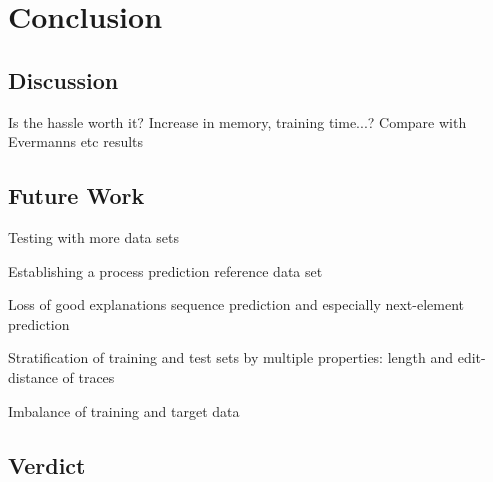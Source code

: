 \chapter{Conclusion} \label{chap:conclusion}
\section{Discussion}
Is the hassle worth it?
Increase in memory, training time...?
Compare with Evermanns etc results

\section{Future Work} \label{sec:conclusion:future-work}
Testing with more data sets

Establishing a process prediction reference data set

Loss of good explanations sequence prediction and especially next-element prediction

Stratification of training and test sets by multiple properties: length and edit-distance of traces

Imbalance of training and target data

\section{Verdict} \label{sec:conclusion:verdict}
